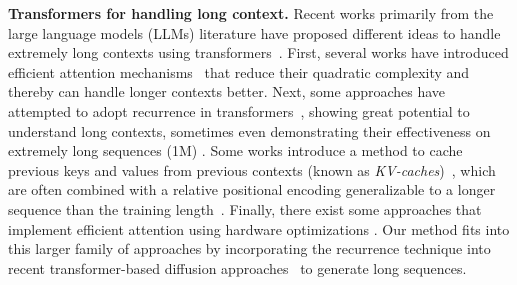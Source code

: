 \vspace{0.02in}
\noindent\textbf{Transformers for handling long context.}
Recent works primarily from the large language models (LLMs) literature have proposed different ideas to handle extremely long contexts using transformers~\citep{vaswani2017attention}. 
First, several works have introduced efficient attention mechanisms~\citep{wang2020linformer,kitaev2020reformer,beltagy2020longformer,choromanski2020rethinking} that reduce their quadratic complexity and thereby can handle longer contexts better. Next, some approaches have attempted to adopt recurrence in transformers~\citep{dai2019transformer,bessonov2023recurrent,bulatov2022recurrent,bulatov2024beyond,hutchins2022block,peng2023rwkv}, showing great potential to understand long contexts, sometimes even demonstrating their effectiveness on extremely long sequences (1M) \citep{bulatov2024beyond}.
Some works introduce a method to cache previous keys and values from previous contexts (known as \emph{KV-caches})~\citep{wu2022memorizing,adnan2024keyformer,pope2023efficiently}, which are often combined with a relative positional encoding generalizable to a longer sequence than the training length~\citep{su2024roformer}. Finally, there exist some approaches that implement
efficient attention using hardware optimizations \citep{dao2022flashattention,liu2023ring}. Our method fits into this larger family of approaches by incorporating the recurrence technique into recent transformer-based diffusion
approaches~\citep{gupta2023photorealistic,Peebles2022DiT} to generate long sequences. %

